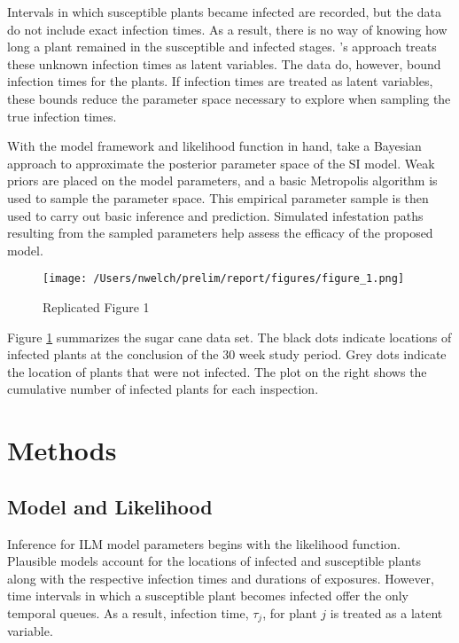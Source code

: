 \documentclass{uwstat572}
\begin{document}
Intervals in which susceptible plants became infected are recorded, but the data do not include exact infection times.  
As a result, there is no way of knowing how long a plant remained in the susceptible and infected stages.
\cite{Brown}'s approach treats these unknown infection times as latent variables.
The data do, however, bound infection times for the plants.
If infection times are treated as latent variables, these bounds reduce the parameter space necessary to explore when sampling the true infection times. 

With the model framework and likelihood function in hand, \cite{Brown} take a Bayesian approach to approximate the posterior parameter space of the SI model. 
Weak priors are placed on the model parameters, and a basic Metropolis algorithm is used to sample the parameter space. 
This empirical parameter sample is then used to carry out basic inference and prediction. 
Simulated infestation paths resulting from the sampled parameters help assess the efficacy of the proposed model. 

\begin{figure}[H]
\centering
\texttt{[image: /Users/nwelch/prelim/report/figures/figure\_1.png]}
\caption{Replicated Figure 1}
   \label{fig:data_plot}
\end{figure}

Figure \ref{fig:data_plot} summarizes the sugar cane data set. The black dots indicate locations of infected plants at the conclusion of the 30 week study period. Grey dots indicate the location of plants that were not infected. The plot on the right shows the cumulative number of infected plants for each inspection. 

\section{Methods}
\subsection{Model and Likelihood}

Inference for ILM model parameters begins with the likelihood function. 
Plausible models account for the locations of infected and susceptible plants along with the respective infection times and durations of exposures. 
However, time intervals in which a susceptible plant becomes infected offer the only temporal queues. 
As a result, infection time, $\tau_j$, for plant $j$ is treated as a latent variable. 
\end{document}

